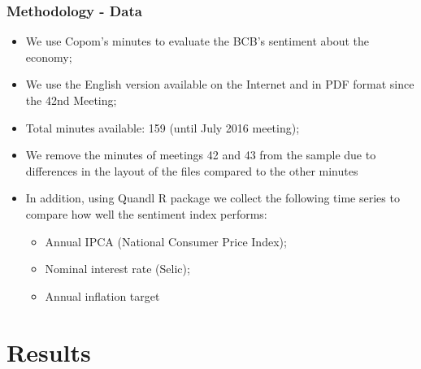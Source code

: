\documentclass[aspectratio=169]{beamer}
\begin{document}
\begin{frame}\frametitle{Methodology - Data}
  \begin{itemize}
  	\item We use Copom's minutes to evaluate the BCB's sentiment about the economy;
    \item We use the English version available on the Internet and in PDF format since the 42nd Meeting;
    \item Total minutes available: 159 (until July 2016 meeting);
    \item We remove the minutes of meetings 42 and 43 from the sample due to differences in the layout of the files compared to the other minutes 
    \item In addition, using Quandl R package we collect the following time series to compare how well the sentiment index performs:
    \begin{itemize}
      \item Annual IPCA (National Consumer Price Index);
      \item Nominal interest rate (Selic);
      \item Annual inflation target
    \end{itemize}
  \end{itemize}
\end{frame}


\section{Results}
\end{document}
